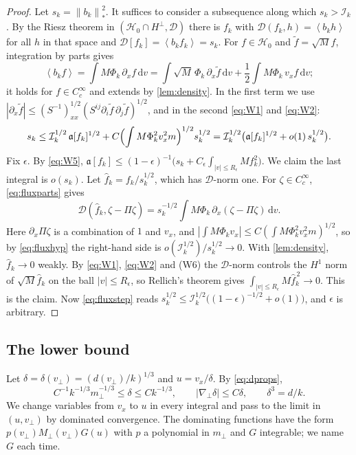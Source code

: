 \documentclass[11pt]{article}
\newcommand{\dd}{\,\mathrm d}
\newcommand{\av}[1]{\left\langle #1\right\rangle}
\newcommand{\D}{\mathcal D}
\newcommand{\HH}{\mathcal H}
\newcommand{\nstar}[1]{\left\|#1\right\|_*}
\theoremstyle{definition}
\theoremstyle{remark}
\numberwithin{equation}{section}
\begin{document}
\begin{proof}
Let $s_k=\nstar{b_k}^2$. It suffices to consider a subsequence along which
$s_k>\mathcal I_k$. By the Riesz theorem in $(\HH_0\cap H^\perp,\D)$ there
is $f_k$ with $\D(f_k,h)=\av{b_kh}$ for all $h$ in that space and
$\D[f_k]=\av{b_kf_k}=s_k$. For $f\in\HH_0$ and
$\widetilde f=\sqrt Mf$, integration by parts gives
\begin{equation}
 \av{b_kf}=\int M\Phi_k\,\partial_xf\dd v
  =\int\sqrt M\,\Phi_k\,\partial_x\widetilde f\dd v
   +\frac12\int M\Phi_k\,v_xf\dd v ;
 \label{eq:fluxparts}
\end{equation}
it holds for $f\in C_c^\infty$ and extends by \cref{lem:density}. In the
first term we use
$|\partial_x\widetilde f|\leq(S^{-1})_{xx}^{1/2}
(S^{ij}\partial_i\widetilde f\,\partial_j\widetilde f)^{1/2}$,
and in the second \eqref{eq:W1} and \eqref{eq:W2}:
\begin{equation}
 s_k\leq\mathcal I_k^{1/2}\,\mathfrak a[f_k]^{1/2}
   +C\Bigl(\int M\Phi_k^2v_x^2m\Bigr)^{1/2}s_k^{1/2}
  =\mathcal I_k^{1/2}\bigl(\mathfrak a[f_k]^{1/2}+o(1)\,s_k^{1/2}\bigr).
 \label{eq:fluxstep}
\end{equation}
Fix $\epsilon$. By \eqref{eq:W5},
$\mathfrak a[f_k]\leq(1-\epsilon)^{-1}\bigl(s_k
+C_\epsilon\int_{|v|\leq R_\epsilon}Mf_k^2\bigr)$. We claim the last
integral is $o(s_k)$. Let $\hat f_k=f_k/s_k^{1/2}$, which has $\D$-norm
one. For $\zeta\in C_c^\infty$, \eqref{eq:fluxparts} gives
\[
 \D(\hat f_k,\zeta-\Pi\zeta)
   =s_k^{-1/2}\int M\Phi_k\,\partial_x(\zeta-\Pi\zeta)\dd v .
\]
Here $\partial_x\Pi\zeta$ is a combination of $1$ and $v_x$, and
$|\int M\Phi_kv_x|\leq C(\int M\Phi_k^2v_x^2m)^{1/2}$, so by
\eqref{eq:fluxhyp} the right-hand side is
$o(\mathcal I_k^{1/2})/s_k^{1/2}\to0$. With \cref{lem:density},
$\hat f_k\to0$ weakly. By \eqref{eq:W1}, \eqref{eq:W2} and (W6) the $\D$-norm controls
the $H^1$ norm of $\sqrt M\hat f_k$ on the ball $|v|\leq R_\epsilon$, so
Rellich's theorem gives
$\int_{|v|\leq R_\epsilon}M\hat f_k^{\,2}\to0$. This is the claim. Now
\eqref{eq:fluxstep} reads
$s_k^{1/2}\leq\mathcal I_k^{1/2}\bigl((1-\epsilon)^{-1/2}+o(1)\bigr)$, and
$\epsilon$ is arbitrary.
\end{proof}

\subsection{The lower bound}

Let $\delta=\delta(v_\perp)=(d(v_\perp)/k)^{1/3}$ and $u=v_x/\delta$. By
\eqref{eq:dprops},
\begin{equation}
 C^{-1}k^{-1/3}m_\perp^{-1/3}\leq\delta\leq Ck^{-1/3},\qquad
 |\nabla_\perp\delta|\leq C\delta,\qquad\delta^3=d/k .
 \label{eq:deltaprops}
\end{equation}
We change variables from $v_x$ to $u$ in every integral and pass to the
limit in $(u,v_\perp)$ by dominated convergence. The dominating functions
have the form $p(v_\perp)M_\perp(v_\perp)G(u)$ with $p$ a polynomial in
$m_\perp$ and $G$ integrable; we name $G$ each time.
\end{document}

